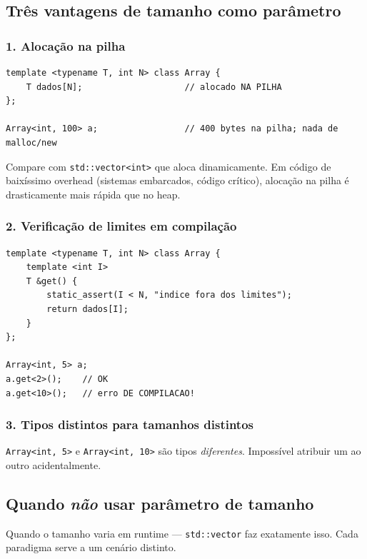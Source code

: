 \documentclass[11pt,a4paper]{article}
\begin{document}
\subsection*{Tr\^es vantagens de tamanho como par\^ametro}

\subsubsection*{1. Aloca\c{c}\~ao na pilha}

\begin{lstlisting}[style=cppcode,numbers=none]
template <typename T, int N> class Array {
    T dados[N];                    // alocado NA PILHA
};

Array<int, 100> a;                 // 400 bytes na pilha; nada de malloc/new
\end{lstlisting}

Compare com \texttt{std::vector<int>} que aloca dinamicamente. Em c\'odigo de baix\'issimo overhead (sistemas embarcados, c\'odigo cr\'itico), aloca\c{c}\~ao na pilha \'e drasticamente mais r\'apida que no heap.

\subsubsection*{2. Verifica\c{c}\~ao de limites em compila\c{c}\~ao}

\begin{lstlisting}[style=cppcode,numbers=none]
template <typename T, int N> class Array {
    template <int I>
    T &get() {
        static_assert(I < N, "indice fora dos limites");
        return dados[I];
    }
};

Array<int, 5> a;
a.get<2>();    // OK
a.get<10>();   // erro DE COMPILACAO!
\end{lstlisting}

\subsubsection*{3. Tipos distintos para tamanhos distintos}

\texttt{Array<int, 5>} e \texttt{Array<int, 10>} s\~ao tipos \emph{diferentes}. Imposs\'ivel atribuir um ao outro acidentalmente.

\subsection*{Quando \emph{n\~ao} usar par\^ametro de tamanho}

Quando o tamanho varia em runtime --- \texttt{std::vector} faz exatamente isso. Cada paradigma serve a um cen\'ario distinto.
\end{document}
